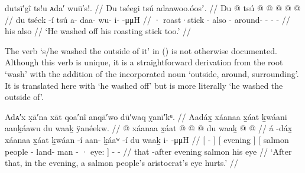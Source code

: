 \ex\label{ex:100-73-wash-off-stick}%
%
\begingl
	\glpreamble	dutsī′gî ts!u ᴀda′ wuū′s!. //
	\glpreamble	Du tséegi tsú adaawoo.óosʼ. //
	\gla	{} Du  @ {} {} tsú
		 @ {} @ {} @ {} @ {} @ {} //
	\glb	{} du tséek -í {} tsú
		a- daa- wu- i-  -μμH //
	\glc	{} · roast·stick - {} also
		- around- - -  - //
	\gld	{} his  {} {} also
		 {} {} {} {} {} //
	\glft	‘He washed off his roasting stick too.’
		//
\endgl
\xe

The verb  ‘s/he washed the outside of it’ in (\lastx) is not otherwise documented.
Although this verb is unique, it is a straightforward derivation from the root  ‘wash’ with the addition of the incorporated noun  ‘outside, around, surrounding’.
It is translated here with ‘he washed off’ but is more literally ‘he washed the outside of’.

\ex\label{ex:100-74-salmon-chief-eye-hurts}%
%
\begingl
	\glpreamble	Adᴀ′x x̣ā′na xāt qoa′nî anqā′wo dū′waq ỵanī′kᵘ. //
	\glpreamble	Aadáx̱ xáanaa x̱áat ḵwáani aanḵáawu du waaḵ ÿanéekw. //
	\gla	{}  @ {} {} 
		{} xáanaa {} 
		{} x̱áat  @ {} 
			 @ {} @ {} 
			du waaḵ {} 
		 @ {} @ {} //
	\glb	{} á -dáx̱ {} 
		{} xáanaa {} 
		{} x̱áat ḵwáan -í 
			aan- ḵáaʷ -í 
			du waaḵ {}
		i-  -μμH //
	\glc	{}[  - {}]
		{}[ evening {}]
		{}[ salmon people - 
			land- man - 
			· eye: {}]
		-  - //
	\gld	{} that -after {}
		{} evening {}
		{} salmon  {} 
			 {} {} 
			his eye {}
		 {} {} {} {} {} //
	\glft	‘After that, in the evening, a salmon people’s aristocrat’s eye hurts.’
		//
\endgl
\xe

